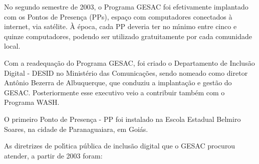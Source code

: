 \documentclass[
12pt,		%
openright,	%
twoside,  %
a4paper,			%
chapter=TITLE,		%
english,			%
french,				%
spanish,			%
brazil				%
]{USPSC-classe/USPSC}
\begin{document}
No segundo semestre de 2003, o Programa GESAC foi efetivamente implantado com os Pontos de Presen\c{c}a (PPs), espa\c{c}o com  computadores conectados \`a internet, via sat\'elite. \`A \'epoca, cada PP deveria ter no m\'{\i}nimo entre cinco e quinze computadores, podendo ser utilizado gratuitamente por cada comunidade local.










Com a readequa\c{c}\~ao do Programa GESAC, foi criado o Departamento de Inclus\~ao Digital - DESID no Minist\'erio das Comunica\c{c}\~oes, sendo nomeado como diretor Ant\^onio Bezerra de Albuquerque, que conduziu a implanta\c{c}\~ao e gest\~ao do GESAC. Posteriormente esse executivo veio a contribuir tamb\'em com o Programa WASH.











\noindent\begin{center}\mbox{\centering{}}\end{center}


O primeiro Ponto de Presen\c{c}a - PP foi  instalado na  Escola Estadual Belmiro Soares, na cidade de Paranaguaiara, em  Goi\'as.










As diretrizes de pol\'{\i}tica p\'ublica de inclus\~ao digital que o GESAC procurou atender, a partir de 2003 foram:
\end{document}
